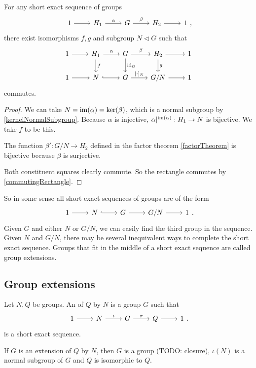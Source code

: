\begin{proposition}
For any short exact sequence of groups
\[ \begin{tikzcd}
1 \rar & H_1 \rar{\alpha} & G \rar{\beta} & H_2 \rar & 1
\end{tikzcd}, \]
there exist isomorphisms $f,g$ and subgroup $N\lhd G$ such that
\[ \begin{tikzcd}
1 \rar & H_1 \dar{f} \rar{\alpha} & G \dar{\id_G} \rar{\beta} & H_2 \dar{g} \rar & 1 \\
1 \rar & N \rar[hookrightarrow] & G \rar{[\cdot]_N} & G/N \rar & 1
\end{tikzcd} \]
commutes.
\end{proposition}
\begin{proof}
We can take $N = \operatorname{im}(\alpha) = \ker(\beta)$, which is a normal subgroup by \ref{kernelNormalSubgroup}. Because $\alpha$ is injective, $\alpha|^{\operatorname{im}(\alpha)}: H_1 \to N$ is bijective. We take $f$ to be this.

The function $\beta': G/N \to H_2$ defined in the factor theorem \ref{factorTheorem} is bijective because $\beta$ is surjective.

Both constituent squares clearly commute. So the rectangle commutes by \ref{commutingRectangle}.
\end{proof}

So in some sense all short exact sequences of groups are of the form
\[ \begin{tikzcd}
1 \rar & N \rar[hookrightarrow] & G \rar & G/N \rar & 1
\end{tikzcd}. \]
Given $G$ and either $N$ or $G/N$, we can easily find the third group in the sequence. Given $N$ and $G/N$, there may be several inequivalent ways to complete the short exact sequence. Groups that fit in the middle of a short exact sequence are called group extensions.

\subsection{Group extensions}
\begin{definition}
Let $N,Q$ be groups. An  of $Q$ by $N$ is a group $G$ such that
\[
\begin{tikzcd}
1 \ar[r] & N \ar[r, "\iota"] & G \ar[r, "\pi"] & Q \ar[r] & 1
\end{tikzcd}.
\]
is a short exact sequence.
\end{definition}
\begin{lemma}
If $G$ is an extension of $Q$ by $N$, then $G$ is a group (TODO: closure), $\iota(N)$ is a normal subgroup of $G$ and $Q$ is isomorphic to $Q$.
\end{lemma}

